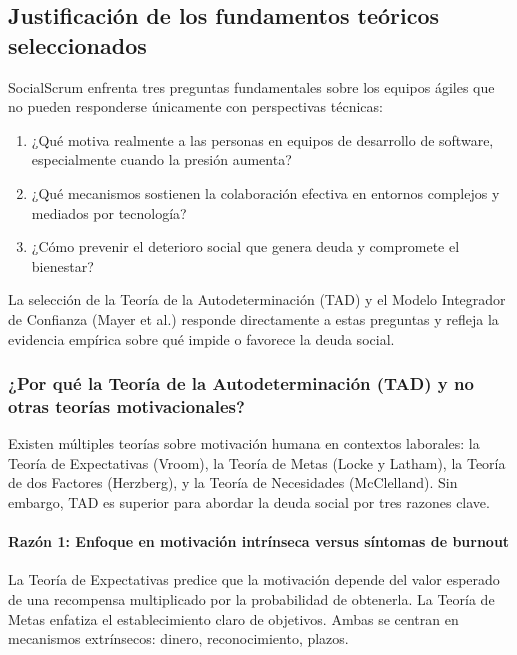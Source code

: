 
\subsection{Justificación de los fundamentos teóricos seleccionados}

SocialScrum enfrenta tres preguntas fundamentales sobre los equipos ágiles que no pueden responderse únicamente con perspectivas técnicas:

\begin{enumerate}
\item ¿Qué motiva realmente a las personas en equipos de desarrollo de software, especialmente cuando la presión aumenta?
\item ¿Qué mecanismos sostienen la colaboración efectiva en entornos complejos y mediados por tecnología?
\item ¿Cómo prevenir el deterioro social que genera deuda y compromete el bienestar?
\end{enumerate}

La selección de la Teoría de la Autodeterminación (TAD) y el Modelo Integrador de Confianza (Mayer et al.) responde directamente a estas preguntas y refleja la evidencia empírica sobre qué impide o favorece la deuda social.

\subsubsection{¿Por qué la Teoría de la Autodeterminación (TAD) y no otras teorías motivacionales?}

Existen múltiples teorías sobre motivación humana en contextos laborales: la Teoría de Expectativas (Vroom), la Teoría de Metas (Locke y Latham), la Teoría de dos Factores (Herzberg), y la Teoría de Necesidades (McClelland). Sin embargo, TAD es superior para abordar la deuda social por tres razones clave.

\paragraph{Razón 1: Enfoque en motivación intrínseca versus síntomas de burnout}

La Teoría de Expectativas predice que la motivación depende del valor esperado de una recompensa multiplicado por la probabilidad de obtenerla. La Teoría de Metas enfatiza el establecimiento claro de objetivos. Ambas se centran en mecanismos extrínsecos: dinero, reconocimiento, plazos.

